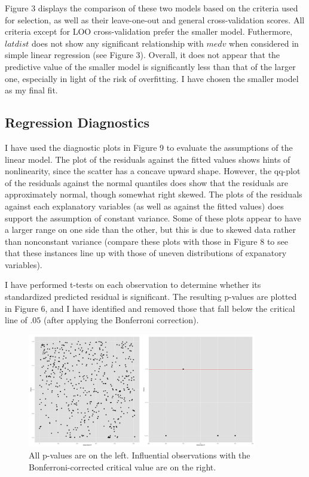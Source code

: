 \documentclass[12pt]{article}
\begin{document}
Figure 3 displays the comparison of these two models based on the criteria used for selection, as well as their leave-one-out and general cross-validation scores.  All criteria except for LOO cross-validation prefer the smaller model.  Futhermore, $latdist$ does not show any significant relationship with $medv$ when considered in simple linear regression (see Figure 3).  Overall, it does not appear that the predictive value of the smaller model is significantly less than that of the larger one, especially in light of the risk of overfitting.  I have chosen the smaller model as my final fit.

\subsection{Regression Diagnostics}

I have used the diagnostic plots in Figure 9 to evaluate the assumptions of the linear model.  The plot of the residuals against the fitted values shows hints of nonlinearity, since the scatter has a concave upward shape.  However, the qq-plot of the residuals against the normal quantiles does show that the residuals are approximately normal, though somewhat right skewed.  The plots of the residuals against each explanatory variables (as well as against the fitted values) does support the assumption of constant variance.  Some of these plots appear to have a larger range on one side than the other, but this is due to skewed data rather than nonconstant variance (compare these plots with those in Figure 8 to see that these instances line up with those of uneven distributions of expanatory variables).

I have performed t-tests on each observation to determine whether its standardized predicted residual is significant.  The resulting p-values are plotted in Figure 6, and I have identified and removed those that fall below the critical line of $.05$ (after applying the Bonferroni correction).

\begin{figure}[ht!]
\centering
\includegraphics[width=100mm]{pValues.png}
\caption{All p-values are on the left.  Influential observations with the Bonferroni-corrected critical value are on the right.}
\end{figure}
\end{document}
